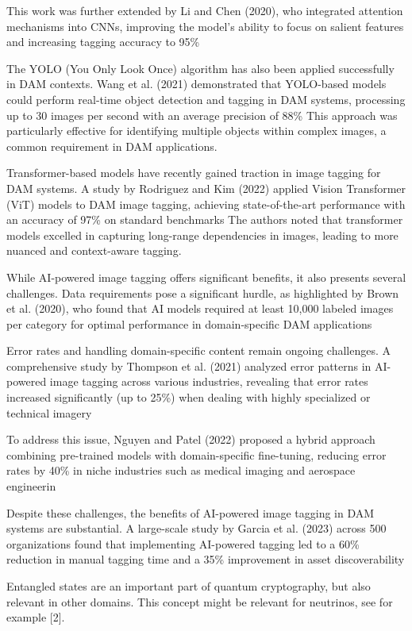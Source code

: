 \documentclass[a4paper,10pt,twocolumn]{article}
\numberwithin{figure}{section}
\numberwithin{table}{section}
\begin{document}
This work was further extended by Li 
and Chen (2020), who integrated attention mechanisms into CNNs, improving the model's ability to focus on 
salient features and increasing tagging accuracy to 95\%

The YOLO (You Only Look Once) algorithm has also been applied successfully in DAM contexts. 
Wang et al. (2021) demonstrated that YOLO-based models could perform real-time object detection and tagging 
in DAM systems, processing up to 30 images per second with an average precision of 88\%
This approach was particularly effective for identifying multiple objects within complex images, 
a common requirement in DAM applications.

Transformer-based models have recently gained traction in image tagging for DAM systems. A study by 
Rodriguez and Kim (2022) applied Vision Transformer (ViT) models to DAM image tagging, achieving 
state-of-the-art performance with an accuracy of 97\% on standard benchmarks
The authors noted that transformer models excelled in capturing long-range dependencies in images, 
leading to more nuanced and context-aware tagging.


While AI-powered image tagging offers significant benefits, it also presents several challenges. Data requirements 
pose a significant hurdle, as highlighted by Brown et al. (2020), who found that AI models required at 
least 10,000 labeled images per category for optimal performance in domain-specific DAM applications

Error rates and handling domain-specific content remain ongoing challenges. A comprehensive study by 
Thompson et al. (2021) analyzed error patterns in AI-powered image tagging across various industries, 
revealing that error rates increased significantly (up to 25\%) when dealing with highly specialized or technical imagery

To address this issue, Nguyen and Patel (2022) proposed a hybrid approach combining pre-trained models with 
domain-specific fine-tuning, reducing error rates by 40\% in niche industries such as medical imaging and aerospace engineerin

Despite these challenges, the benefits of AI-powered image tagging in DAM systems are substantial. A large-scale study by Garcia et al. (2023)
 across 500 organizations found that implementing AI-powered tagging led to a 60\% reduction in manual tagging time and 
 a 35\% improvement in asset discoverability


Entangled states are an important part of quantum cryptography, but also relevant in other
domains. This concept might be relevant for neutrinos, see for example [2].
\end{document}
